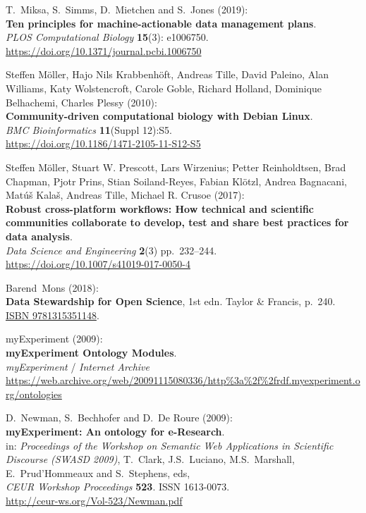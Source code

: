 T.~Miksa, S.~Simms, D.~Mietchen and S.~Jones (2019):\\
\textbf{Ten principles for machine-actionable data management plans}.\\
\emph{PLOS Computational Biology} \textbf{15}(3): e1006750.\\
\url{https://doi.org/10.1371/journal.pcbi.1006750}

Steffen Möller, Hajo Nils Krabbenhöft, Andreas Tille, David
Paleino, Alan Williams, Katy Wolstencroft, Carole Goble, Richard
Holland, Dominique Belhachemi, Charles Plessy (2010):\\
\textbf{Community-driven computational biology with Debian Linux}.\\
\emph{BMC Bioinformatics} \textbf{11}(Suppl 12):S5.\\
\url{https://doi.org/10.1186/1471-2105-11-S12-S5}

Steffen Möller, Stuart W. Prescott, Lars Wirzenius; Petter
Reinholdtsen, Brad Chapman, Pjotr Prins, Stian Soiland-Reyes, Fabian
Klötzl, Andrea Bagnacani, Matúš Kalaš, Andreas Tille, Michael R. Crusoe
(2017):\\
\textbf{Robust cross-platform workflows: How technical and scientific
communities collaborate to develop, test and share best practices for
data analysis}.\\
\emph{Data Science and Engineering} \textbf{2}(3) pp.~232--244.\\
\url{https://doi.org/10.1007/s41019-017-0050-4}

Barend~Mons (2018):\\
\textbf{Data Stewardship for Open Science}, 1st edn. Taylor \& Francis,
p.~240. \href{https://identifiers.org/isbn/9781315351148}{ISBN
9781315351148}.

myExperiment (2009):\\
\textbf{myExperiment Ontology Modules}.\\
\emph{myExperiment} / \emph{Internet Archive}\\
\url{https://web.archive.org/web/20091115080336/http\%3a\%2f\%2frdf.myexperiment.org/ontologies}

D.~Newman, S.~Bechhofer and D.~De Roure (2009):\\
\textbf{myExperiment: An ontology for e-Research}.\\
in: \emph{Proceedings of the Workshop on Semantic Web Applications in
Scientific Discourse (SWASD 2009)}, T.~Clark, J.S.~Luciano,
M.S.~Marshall, E.~Prud'Hommeaux and S.~Stephens, eds,\\
\emph{CEUR Workshop Proceedings} \textbf{523}. ISSN 1613-0073.\\
\url{http://ceur-ws.org/Vol-523/Newman.pdf}

